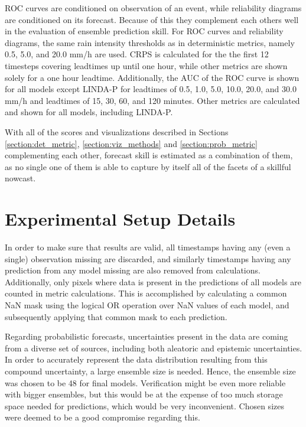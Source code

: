 ROC curves are conditioned on observation of an event, while reliability diagrams are conditioned on its forecast. Because of this they complement each others well in the evaluation of ensemble prediction skill. For ROC curves and reliability diagrams, the same rain intensity thresholds as in deterministic metrics, namely 0.5, 5.0, and 20.0 mm/h are used. CRPS is calculated for the the first 12 timesteps covering leadtimes up until one hour, while other metrics are shown solely for a one hour leadtime. Additionally, the AUC of the ROC curve is shown for all models except LINDA-P for leadtimes of 0.5, 1.0, 5.0, 10.0, 20.0, and 30.0 mm/h and leadtimes of 15, 30, 60, and 120 minutes. Other metrics are calculated and shown for all models, including LINDA-P.

 With all of the scores and visualizations described in Sections \ref{section:det_metric}, \ref{section:viz_methods} and \ref{section:prob_metric} complementing each other, forecast skill is estimated as a combination of them, as no single one of them is able to capture by itself all of the facets of a skillful nowcast. 
 
\section{Experimental Setup Details}
\label{section:exp}

In order to make sure that results are valid, all timestamps having any (even a single) observation missing are discarded, and similarly timestamps having any prediction from any model missing are also removed from calculations. Additionally, only pixels where data is present in the predictions of all models are counted in metric calculations. This is accomplished by calculating a common NaN mask using the logical OR operation over NaN values of each model, and subsequently applying that common mask to each prediction.

Regarding probabilistic forecasts, uncertainties present in the data are coming from a diverse set of sources, including both aleatoric and epistemic uncertainties. In order to accurately represent the data distribution resulting from this compound uncertainty, a large ensemble size is needed. Hence, the ensemble size was chosen to be 48 for final models. Verification might be even more reliable with bigger ensembles, but this would be at the expense of too much storage space needed for predictions, which would be very inconvenient. Chosen sizes were deemed to be a good compromise regarding this.

